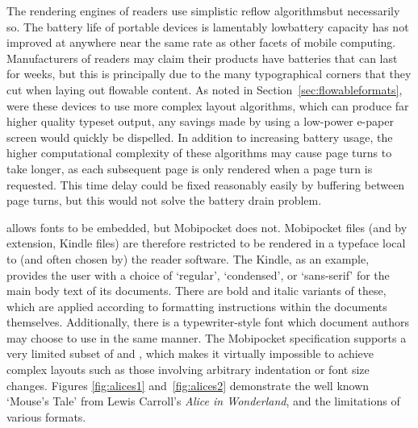 The rendering engines of \ebook{} readers use simplistic reflow algorithms\ed but necessarily so. The battery life of portable devices is lamentably low\ed battery capacity has not improved at anywhere near the same rate as other facets of mobile computing. Manufacturers of \ebook{} readers may claim their products have batteries that can last for weeks, but this is principally due to the many typographical corners that they cut when laying out flowable content. As noted in Section~\ref{sec:flowableformats}, were these devices to use more complex layout algorithms, which can produce far higher quality typeset output, any savings made by using a low-power e-paper screen would quickly be dispelled. In addition to increasing battery usage, the higher computational complexity of these algorithms may cause page turns to take longer, as each subsequent page is only rendered when a page turn is requested. This time delay could be fixed reasonably easily by buffering between page turns, but this would not solve the battery drain problem.


\epub{} allows fonts to be embedded, but Mobipocket does not. Mobipocket files (and by extension, Kindle files) are therefore restricted to be rendered in a typeface local to (and often chosen by) the reader software. The Kindle, as an example, provides the user with a choice of `regular', `condensed', or `sans-serif' for the main body text of its documents. There are bold and italic variants of these, which are applied according to formatting instructions within the documents themselves. Additionally, there is a typewriter-style font which document authors may choose to use in the same manner. The Mobipocket specification supports a very limited subset of \html{} and \css{}, which makes it virtually impossible to achieve complex layouts such as those involving arbitrary indentation or font size changes. Figures \ref{fig:alices1} and~\ref{fig:alices2} demonstrate the well known `Mouse's Tale' from Lewis Carroll's \emph{Alice in Wonderland}, and the limitations of various formats.


